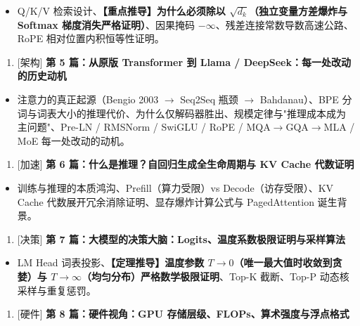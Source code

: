\begin{itemize}
  \item Q/K/V 检索设计、\textbf{【重点推导】为什么必须除以 $\sqrt{d_k}$（独立变量方差爆炸与 Softmax 梯度消失严格证明）}、因果掩码 $-\infty$、残差连接常数导数高速公路、RoPE 相对位置内积恒等性证明。
\end{itemize}

\begin{enumerate}
  \item {}[架构] \textbf{\textbf{第 5 篇：从原版 Transformer 到 Llama / DeepSeek：每一处改动的历史动机}}
\end{enumerate}

\begin{itemize}
  \item 注意力的真正起源（Bengio 2003 $\rightarrow$ Seq2Seq 瓶颈 $\rightarrow$ Bahdanau）、BPE 分词与词表大小的推理代价、为什么仅解码器胜出、规模定律与"推理成本成为主问题"、Pre-LN / RMSNorm / SwiGLU / RoPE / MQA$\rightarrow$GQA$\rightarrow$MLA / MoE 每一处改动的动机。
\end{itemize}

\begin{enumerate}
  \item {}[加速] \textbf{\textbf{第 6 篇：什么是推理？自回归生成全生命周期与 KV Cache 代数证明}}
\end{enumerate}

\begin{itemize}
  \item 训练与推理的本质鸿沟、Prefill（算力受限）vs Decode（访存受限）、KV Cache 代数展开冗余消除证明、显存爆炸计算公式与 PagedAttention 诞生背景。
\end{itemize}

\begin{enumerate}
  \item {}[决策] \textbf{\textbf{第 7 篇：大模型的决策大脑：Logits、温度系数极限证明与采样算法}}
\end{enumerate}

\begin{itemize}
  \item LM Head 词表投影、\textbf{【定理推导】温度参数 $T \to 0$（唯一最大值时收敛到贪婪）与 $T \to \infty$（均匀分布）严格数学极限证明}、Top-K 截断、Top-P 动态核采样与重复惩罚。
\end{itemize}

\begin{enumerate}
  \item {}[硬件] \textbf{\textbf{第 8 篇：硬件视角：GPU 存储层级、FLOPs、算术强度与浮点格式}}
\end{enumerate}

